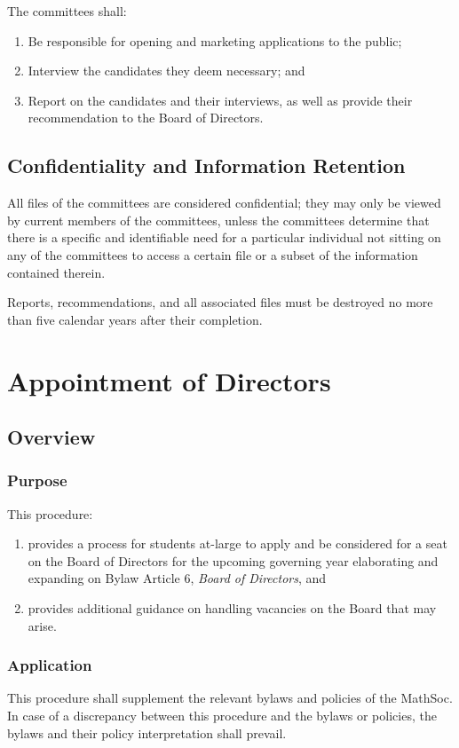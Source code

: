 The committees shall: 
\begin{enumerate}
    \item Be responsible for opening and marketing applications to the public;
    \item Interview the candidates they deem necessary; and
    \item Report on the candidates and their interviews, as well as provide their recommendation to the Board of Directors. 
\end{enumerate}

\subsection{Confidentiality and Information Retention}

All files of the committees are considered confidential; they may only be viewed by current members of the committees, unless the committees determine that there is a specific and identifiable need for a particular individual not sitting on any of the committees to access a certain file or a subset of the information contained therein.

Reports, recommendations, and all associated files must be destroyed no more than five calendar years after their completion.

\section{Appointment of Directors}
\subsection{Overview}
\subsubsection{Purpose}
This procedure:
\begin{enumerate}
    \item provides a process for students at-large to apply and be considered for a seat on the 
        Board of Directors for the upcoming governing year elaborating and expanding on Bylaw Article 6,
        \textit{Board of Directors}, and
    \item provides additional guidance on handling vacancies on the Board that may arise. 
\end{enumerate}

\subsubsection{Application}
This procedure shall supplement the relevant bylaws and policies of the MathSoc. 
In case of a discrepancy between this procedure and the bylaws or policies, the bylaws and their policy interpretation shall prevail.


